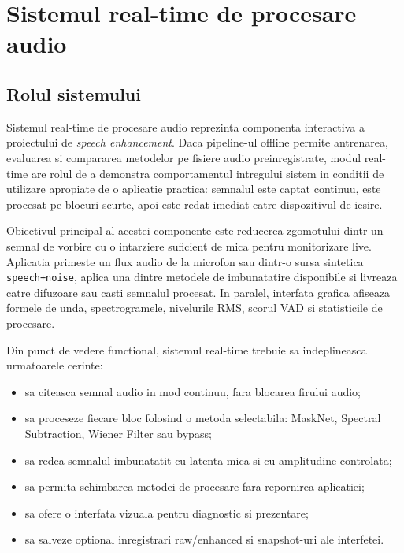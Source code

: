 \chapter{Sistemul real-time de procesare audio}

\section{Rolul sistemului}

Sistemul real-time de procesare audio reprezinta componenta interactiva a
proiectului de \textit{speech enhancement}. Daca pipeline-ul offline permite
antrenarea, evaluarea si compararea metodelor pe fisiere audio preinregistrate,
modul real-time are rolul de a demonstra comportamentul intregului sistem in
conditii de utilizare apropiate de o aplicatie practica: semnalul este captat
continuu, este procesat pe blocuri scurte, apoi este redat imediat catre
dispozitivul de iesire.

Obiectivul principal al acestei componente este reducerea zgomotului dintr-un
semnal de vorbire cu o intarziere suficient de mica pentru monitorizare live.
Aplicatia primeste un flux audio de la microfon sau dintr-o sursa sintetica
\texttt{speech+noise}, aplica una dintre metodele de imbunatatire disponibile
si livreaza catre difuzoare sau casti semnalul procesat. In paralel, interfata
grafica afiseaza formele de unda, spectrogramele, nivelurile RMS, scorul VAD
si statisticile de procesare.

Din punct de vedere functional, sistemul real-time trebuie sa indeplineasca
urmatoarele cerinte:

\begin{itemize}
    \item sa citeasca semnal audio in mod continuu, fara blocarea firului audio;
    \item sa proceseze fiecare bloc folosind o metoda selectabila: MaskNet,
    Spectral Subtraction, Wiener Filter sau bypass;
    \item sa redea semnalul imbunatatit cu latenta mica si cu amplitudine
    controlata;
    \item sa permita schimbarea metodei de procesare fara repornirea aplicatiei;
    \item sa ofere o interfata vizuala pentru diagnostic si prezentare;
    \item sa salveze optional inregistrari raw/enhanced si snapshot-uri ale
    interfetei.
\end{itemize}

